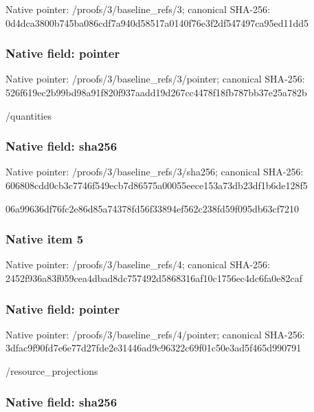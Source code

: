 \documentclass[10pt,a4paper]{article}
\begin{document}
Native pointer: /proofs/3/baseline\_refs/3; canonical SHA-256: 0d4dca3800b745ba086cdf7a\allowbreak{}940d58517a0140f76e3f2df5\allowbreak{}47497ca95ed11dd5



\subsubsection{Native field: pointer}


Native pointer: /proofs/3/baseline\_refs/3/pointer; canonical SHA-256: 526f619ec2b99bd98a91f820\allowbreak{}f937aadd19d267cc4478f18f\allowbreak{}b787bb37e25a782b


/quantities


\subsubsection{Native field: sha256}


Native pointer: /proofs/3/baseline\_refs/3/sha256; canonical SHA-256: 606808cdd0cb3c7746f549ec\allowbreak{}b7d86575a00055eece153a73\allowbreak{}db23df1b6de128f5


06a99636df76fc2e86d85a74\allowbreak{}378fd56f33894ef562c238fd\allowbreak{}59f095db63cf7210


\subsubsection{Native item 5}


Native pointer: /proofs/3/baseline\_refs/4; canonical SHA-256: 2452f936a83f059cea4dbad8\allowbreak{}dc757492d5868316af10c175\allowbreak{}6ec4dc6fa0e82caf



\subsubsection{Native field: pointer}


Native pointer: /proofs/3/baseline\_refs/4/pointer; canonical SHA-256: 3dfac9f90fd7e6e77d27fde2\allowbreak{}e31446ad9c96322c69f01c50\allowbreak{}e3ad5f465d990791


/resource\_projections


\subsubsection{Native field: sha256}
\end{document}
